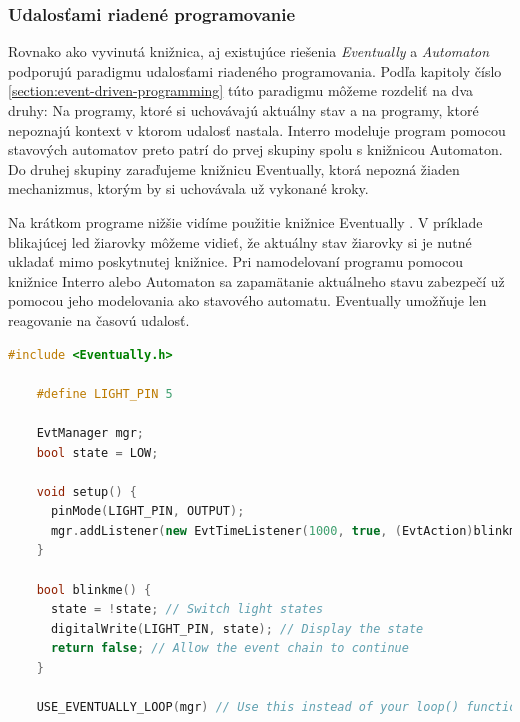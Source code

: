 \subsubsection{Udalosťami riadené programovanie}
Rovnako ako vyvinutá knižnica, aj existujúce riešenia \textit{Eventually} a \textit{Automaton} podporujú paradigmu udalosťami riadeného programovania. Podľa kapitoly
číslo \ref{section:event-driven-programming} túto paradigmu môžeme rozdeliť na dva druhy: Na programy, ktoré si uchovávajú aktuálny stav a na programy, ktoré nepoznajú
kontext v ktorom udalosť nastala. Interro modeluje program pomocou stavových automatov preto patrí do prvej skupiny spolu s knižnicou Automaton. Do druhej skupiny
zaraďujeme knižnicu Eventually, ktorá nepozná žiaden mechanizmus, ktorým by si uchovávala už vykonané kroky. \par
Na krátkom programe nižšie vidíme použitie knižnice Eventually \cite{bartlettEventually2021}. V príklade blikajúcej led žiarovky môžeme vidieť,
že aktuálny stav žiarovky si je nutné ukladať mimo poskytnutej knižnice. Pri namodelovaní programu pomocou knižnice Interro alebo Automaton
sa zapamätanie aktuálneho stavu zabezpečí už pomocou jeho modelovania ako stavového automatu. Eventually umožňuje len reagovanie na časovú udalosť.
\begin{lstlisting}[language=c++]      
    #include <Eventually.h>       

    #define LIGHT_PIN 5    

    EvtManager mgr;
    bool state = LOW;    

    void setup() {
      pinMode(LIGHT_PIN, OUTPUT);
      mgr.addListener(new EvtTimeListener(1000, true, (EvtAction)blinkme)); 
    }    

    bool blinkme() {
      state = !state; // Switch light states
      digitalWrite(LIGHT_PIN, state); // Display the state
      return false; // Allow the event chain to continue
    }    

    USE_EVENTUALLY_LOOP(mgr) // Use this instead of your loop() function.    
\end{lstlisting}

